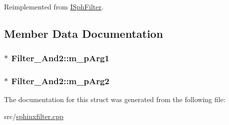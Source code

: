 Reimplemented from \hyperlink{structISphFilter_a90e305bb9949cebb91a7f7d038e6789a}{I\-Sph\-Filter}.



\subsection{Member Data Documentation}
\hypertarget{structFilter__And2_a4ac068389f308d584ba9623dc1b3921e}{
\subsubsection[{m\-\_\-p\-Arg1}]{$\ast$ Filter\-\_\-\-And2\-::m\-\_\-p\-Arg1}}\label{structFilter__And2_a4ac068389f308d584ba9623dc1b3921e}
\hypertarget{structFilter__And2_a4f421001615910020d1b404f5afe3314}{
\subsubsection[{m\-\_\-p\-Arg2}]{$\ast$ Filter\-\_\-\-And2\-::m\-\_\-p\-Arg2}}\label{structFilter__And2_a4f421001615910020d1b404f5afe3314}


The documentation for this struct was generated from the following file\-:\begin{DoxyCompactItemize}
\item 
src/\hyperlink{sphinxfilter_8cpp}{sphinxfilter.\-cpp}\end{DoxyCompactItemize}
